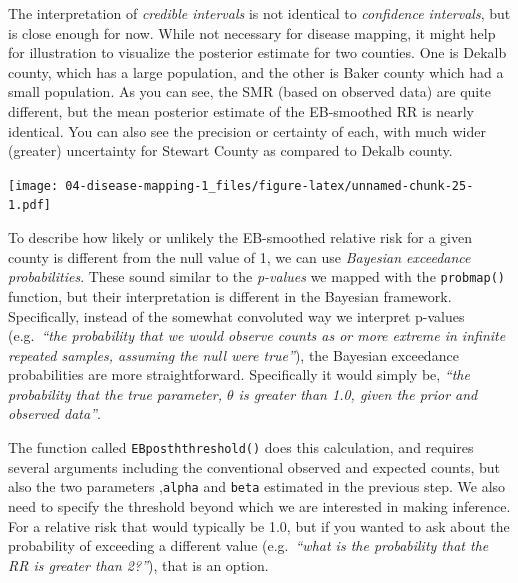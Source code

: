 \documentclass[
]{book}
\newenvironment{Shaded}{\begin{snugshade}}{\end{snugshade}}
\newcommand{\AttributeTok}[1]{\textcolor[rgb]{0.77,0.63,0.00}{#1}}
\newcommand{\DecValTok}[1]{\textcolor[rgb]{0.00,0.00,0.81}{#1}}
\newcommand{\FunctionTok}[1]{\textcolor[rgb]{0.00,0.00,0.00}{#1}}
\newcommand{\NormalTok}[1]{#1}
\newcommand{\OtherTok}[1]{\textcolor[rgb]{0.56,0.35,0.01}{#1}}
\newcommand{\SpecialCharTok}[1]{\textcolor[rgb]{0.00,0.00,0.00}{#1}}
\begin{document}
The interpretation of \emph{credible intervals} is not identical to \emph{confidence intervals}, but is close enough for now. While not necessary for disease mapping, it might help for illustration to visualize the posterior estimate for two counties. One is Dekalb county, which has a large population, and the other is Baker county which had a small population. As you can see, the SMR (based on observed data) are quite different, but the mean posterior estimate of the EB-smoothed RR is nearly identical. You can also see the precision or certainty of each, with much wider (greater) uncertainty for Stewart County as compared to Dekalb county.

\texttt{[image: 04-disease-mapping-1\_files/figure-latex/unnamed-chunk-25-1.pdf]}

To describe how likely or unlikely the EB-smoothed relative risk for a given county is different from the null value of 1, we can use \emph{Bayesian exceedance probabilities}. These sound similar to the \emph{p-values} we mapped with the \texttt{probmap()} function, but their interpretation is different in the Bayesian framework. Specifically, instead of the somewhat convoluted way we interpret p-values (e.g.~\emph{``the probability that we would observe counts as or more extreme in infinite repeated samples, assuming the null were true''}), the Bayesian exceedance probabilities are more straightforward. Specifically it would simply be, \emph{``the probability that the true parameter, \(\theta\) is greater than 1.0, given the prior and observed data''}.

The function called \texttt{EBposththreshold()} does this calculation, and requires several arguments including the conventional observed and expected counts, but also the two parameters ,\texttt{alpha} and \texttt{beta} estimated in the previous step. We also need to specify the threshold beyond which we are interested in making inference. For a relative risk that would typically be 1.0, but if you wanted to ask about the probability of exceeding a different value (e.g.~\emph{``what is the probability that the RR is greater than 2?''}), that is an option.

\begin{Shaded}
\end{Shaded}
\end{document}
